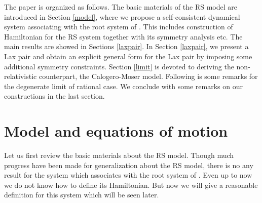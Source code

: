 \documentclass[a4paper,12pt]{article}
\begin{document}
The paper is organized as follows. The basic materials of the \coordHE{} RS
model are introduced in Section \ref{model}, where we propose a
self-consistent dynamical system associating with the root system of \coordHE{}
. This includes construction of Hamiltonian for the \coordHE{} RS system
together with its symmetry analysis etc. The main results are showed in
Sections \ref{laxpair}. In Section \ref{laxpair}, we present a Lax pair and
obtain an  explicit general form for the Lax pair by imposing some
additional symmetry constraints. Section \ref{limit} is devoted to deriving
the non-relativistic counterpart, the Calogero-Moser model. Following is
some remarks for the degenerate limit of rational case. We conclude with some
remarks on our constructions in the last section.

\section{Model and equations of motion}

\setcounter{equation}{0} \label{model}

Let us first review the basic materials about the \coordHE{} RS model. Though
much progress have been made for generalization about the RS model\cite
{r2,ko1,di,kai3,Che00,Che01}, there is no any result for the system which
associates with the root system of \coordHE{}. Even up to now we do not know
how to define its Hamiltonian. But now we will give a reasonable definition
for this system which will be seen later.
\end{document}
